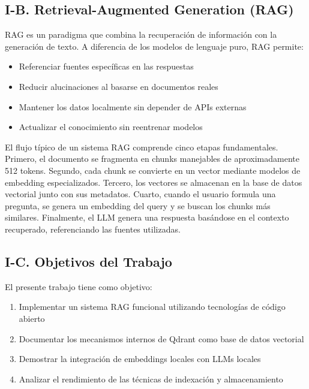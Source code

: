 \documentclass[conference]{IEEEtran}
\begin{document}
\subsection{I-B. Retrieval-Augmented Generation (RAG)}

RAG es un paradigma que combina la recuperación de información con la generación de texto. A diferencia de los modelos de lenguaje puro, RAG permite:

\begin{itemize}
    \item Referenciar fuentes específicas en las respuestas
    \item Reducir alucinaciones al basarse en documentos reales
    \item Mantener los datos localmente sin depender de APIs externas
    \item Actualizar el conocimiento sin reentrenar modelos
\end{itemize}

El flujo típico de un sistema RAG comprende cinco etapas fundamentales. Primero, el documento se fragmenta en chunks manejables de aproximadamente 512 tokens. Segundo, cada chunk se convierte en un vector mediante modelos de embedding especializados. Tercero, los vectores se almacenan en la base de datos vectorial junto con sus metadatos. Cuarto, cuando el usuario formula una pregunta, se genera un embedding del query y se buscan los chunks más similares. Finalmente, el LLM genera una respuesta basándose en el contexto recuperado, referenciando las fuentes utilizadas.

\subsection{I-C. Objetivos del Trabajo}

El presente trabajo tiene como objetivo:

\begin{enumerate}
    \item Implementar un sistema RAG funcional utilizando tecnologías de código abierto
    \item Documentar los mecanismos internos de Qdrant como base de datos vectorial
    \item Demostrar la integración de embeddings locales con LLMs locales
    \item Analizar el rendimiento de las técnicas de indexación y almacenamiento
\end{enumerate}

\end{document}

